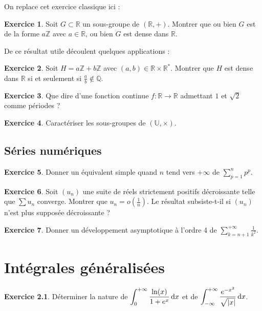 \documentclass[12pt,a4paper]{book}
\renewcommand{\d}{{\, \rm d}}
\theoremstyle{definition}
\newtheorem{exo}{Exercice}[section]
\theoremstyle{remark}
\newcommand{\Z}{\mathbb{Z}}
\newcommand{\Q}{\mathbb{Q}}
\newcommand{\R}{\mathbb{R}}
\renewcommand{\d}{{\rm \, d}}
\begin{document}
On replace cet exercice classique ici :

\begin{exo}
    Soit $G \subset \R$ un sous-groupe de $(\R,+)$. Montrer que ou bien $G$ est de la forme $a\Z$ avec $a \in \R$, ou bien $G$ est dense dans $\R$.
\end{exo}

De ce résultat utile découlent quelques applications :

\begin{exo}
    Soit $H = a\Z + b\Z$ avec $(a,b) \in \R\times\R^*$. Montrer que $H$ est dense dans $\R$ si et seulement si $\frac{a}{b} \notin \Q$.
\end{exo}

\begin{exo}
    Que dire d'une fonction continue $f : \R \to \R$ admettant $1$ et $\sqrt{2}$ comme périodes ?
\end{exo}

\begin{exo}
    Caractériser les sous-groupes de $(\mathbb{U}, \times)$.
\end{exo}

\section{Séries numériques}

\begin{exo}
    Donner un équivalent simple quand $n$ tend vers $+\infty$ de $\sum_{p=1}^n p^p$.
\end{exo}

\begin{exo}
    Soit $(u_n)$ une suite de réels strictement positifs décroissante telle que $\sum u_n$ converge. Montrer que $u_n = o\left(\frac{1}{n}\right)$. Le résultat subsiste-t-il si $(u_n)$ n'est plus supposée décroissante ?
\end{exo}

\begin{exo}
    Donner un développement asymptotique à l'ordre 4 de $\displaystyle \sum_{k=n+1}^{+\infty} \frac{1}{k^2}$.
\end{exo}

\chapter{Intégrales généralisées}

\begin{exo}
    Déterminer la nature de $\displaystyle \int_0^{+\infty} \frac{\ln(x)}{1 + e^x} \d x$ et de $\displaystyle \int_{-\infty}^{+\infty} \frac{e^{-x^2}}{\sqrt{|x|}} \d x$.
\end{exo}
\end{document}

